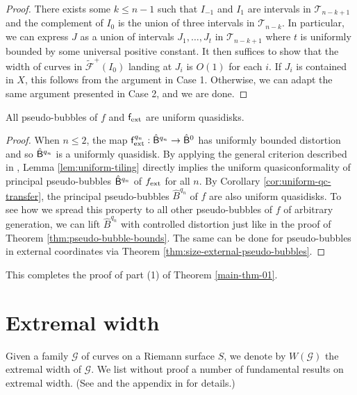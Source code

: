\documentclass{amsart}
\begin{document}
\begin{proof}
    There exists some $k \leq n-1$ such that $I_{-1}$ and $I_1$ are intervals in $\mathcal{T}_{n-k+1}$ and the complement of $I_0$ is the union of three intervals in $\mathcal{T}_{n-k} $. 
    In particular, we can express $J$ as a union of intervals $J_1, \ldots, J_t$ in $\mathcal{T}_{n-k+1} $ where $t$ is uniformly bounded by some universal positive constant. 
    It then suffices to show that the width of curves in $\widetilde{\mathcal{F}}^+(I_0)$ landing at $J_i$ is $O(1)$ for each $i$. 
    If $J_i$ is contained in $X$, this follows from the argument in Case 1. Otherwise, we can adapt the same argument presented in Case 2, and we are done.
\end{proof}

\begin{theorem}
\label{thm:uniform-quasiconformality}
    All pseudo-bubbles of $f$ and $\mathsf{f}_{\textnormal{ext}}$ are uniform quasidisks.
\end{theorem}

\begin{proof}
    When $n \leq 2$, the map $\mathsf{f}_{\textnormal{ext}}^{q_n}: \hat{\mathsf{B}}^{q_n} \to \hat{\mathsf{B}}^0$ has uniformly bounded distortion and so $\hat{\mathsf{B}}^{q_n}$ is a uniformly quasidisk.
    By applying the general criterion described in \cite[Lemma 11.3]{DL22}, Lemma \ref{lem:uniform-tiling} directly implies the uniform quasiconformality of principal pseudo-bubbles $\hat{\mathsf{B}}^{q_n}$ of $f_{\textnormal{ext}}$ for all $n$.
    By Corollary \ref{cor:uniform-qc-transfer}, the principal pseudo-bubbles $\hat{B}^{q_n}$ of $f$ are also uniform quasidisks.
    To see how we spread this property to all other pseudo-bubbles of $f$ of arbitrary generation, we can lift $\hat{B}^{q_n}$ with controlled distortion just like in the proof of Theorem \ref{thm:pseudo-bubble-bounds}. 
    The same can be done for pseudo-bubbles in external coordinates via Theorem \ref{thm:size-external-pseudo-bubbles}.
\end{proof}

This completes the proof of part (1) of Theorem \ref{main-thm-01}.

\appendix

\section{Extremal width}
\label{sec:appendix}

Given a family $\mathcal{G}$ of curves on a Riemann surface $S$, we denote by $W(\mathcal{G})$ the extremal width of $\mathcal{G}$. We list without proof a number of fundamental results on extremal width. (See \cite{A06} and the appendix in \cite{KL09} for details.)
\end{document}
